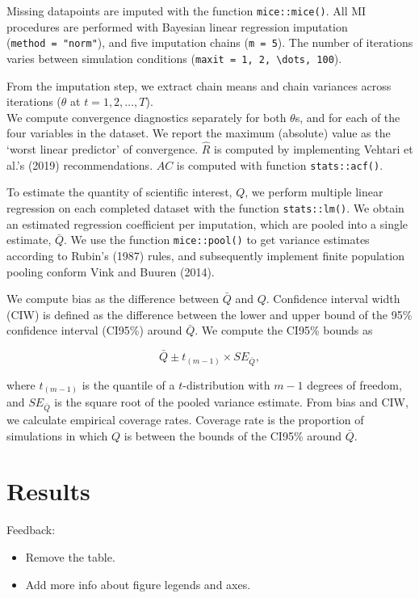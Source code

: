 \documentclass[
  Royal, times, sageapa]{sagej}
\begin{document}
Missing datapoints are imputed with the function \texttt{mice::mice()}.
All MI procedures are performed with Bayesian linear regression
imputation (\texttt{method\ =\ "norm"}), and five imputation chains
(\texttt{m\ =\ 5}). The number of iterations varies between simulation
conditions (\texttt{maxit\ =\ 1,\ 2,\ \textbackslash{}dots,\ 100}).

From the imputation step, we extract chain means and chain variances
across iterations (\(\theta\) at \(t = 1,2,\dots,T\)).\\
We compute convergence diagnostics separately for both \(\theta\)s, and
for each of the four variables in the dataset. We report the maximum
(absolute) value as the `worst linear predictor' of convergence.
\(\widehat{R}\) is computed by implementing Vehtari et al.'s (2019)
recommendations. \(AC\) is computed with function \texttt{stats::acf()}.

To estimate the quantity of scientific interest, \(Q\), we perform
multiple linear regression on each completed dataset with the function
\texttt{stats::lm()}. We obtain an estimated regression coefficient per
imputation, which are pooled into a single estimate, \(\bar{Q}\). We use
the function \texttt{mice::pool()} to get variance estimates according
to Rubin's (1987) rules, and subsequently implement finite population
pooling conform Vink and Buuren (2014).

We compute bias as the difference between \(\bar{Q}\) and \(Q\).
Confidence interval width (CIW) is defined as the difference between the
lower and upper bound of the 95\% confidence interval (CI95\%) around
\(\bar{Q}\). We compute the CI95\% bounds as

\[\bar{Q} \pm t_{(m-1)} \times SE_{\bar{Q}},\]

where \(t_{(m-1)}\) is the quantile of a \(t\)-distribution with \(m-1\)
degrees of freedom, and \(SE_{\bar{Q}}\) is the square root of the
pooled variance estimate. From bias and CIW, we calculate empirical
coverage rates. Coverage rate is the proportion of simulations in which
\(Q\) is between the bounds of the CI95\% around \(\bar{Q}\).

\hypertarget{results}{%
\section{Results}\label{results}}

Feedback:

\begin{itemize}
\item
  Remove the table.
\item
  Add more info about figure legends and axes.
\end{itemize}
\end{document}
